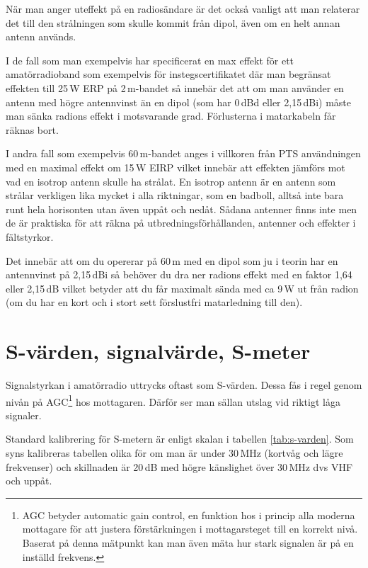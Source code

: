När man anger uteffekt på en radiosändare är det också vanligt att man
relaterar det till den strålningen som skulle kommit från dipol, även om en
helt annan antenn används.

I de fall som man exempelvis har specificerat en max effekt för ett
amatörradioband som exempelvis för instegscertifikatet där man begränsat
effekten till 25\,W ERP på 2\,m-bandet så innebär det att om man använder en
antenn med högre antennvinst än en dipol (som har 0\,dBd eller 2,15\,dBi)
måste man sänka radions effekt i motsvarande grad. Förlusterna i matarkabeln
får räknas bort.

I andra fall som exempelvis 60\,m-bandet anges i villkoren från PTS
användningen med en maximal effekt om 15\,W EIRP vilket innebär att effekten
jämförs mot vad en isotrop antenn skulle ha strålat. En isotrop antenn är en
antenn som strålar verkligen lika mycket i alla riktningar, som en badboll,
alltså inte bara runt hela horisonten utan även uppåt och nedåt. Sådana
antenner finns inte men de är praktiska för att räkna på
utbredningsförhållanden, antenner och effekter i fältstyrkor.

Det innebär att om du opererar på 60\,m med en dipol som ju i teorin har en
antennvinst på 2,15\,dBi så behöver du dra ner radions effekt med en faktor
1,64 eller 2,15\,dB vilket betyder att du får maximalt sända med ca 9\,W ut
från radion (om du har en kort och i stort sett förslustfri matarledning till
den).

\clearpage

\section{S-värden, signalvärde, S-meter}

Signalstyrkan i amatörradio uttrycks oftast som S-värden. Dessa fås i regel
genom nivån på AGC\footnote{AGC betyder automatic gain control, en funktion
hos i princip alla moderna mottagare för att justera förstärkningen i
mottagarsteget till en korrekt nivå. Baserat på denna mätpunkt kan man även
mäta hur stark signalen är på en inställd frekvens.} hos mottagaren. Därför
ser man sällan utslag vid riktigt låga signaler.

Standard kalibrering för S-metern är enligt skalan i tabellen
\ref{tab:s-varden}. Som syns kalibreras tabellen olika för om man är under
30\,MHz (kortvåg och lägre frekvenser) och skillnaden är 20\,dB med högre
känslighet över 30\,MHz dvs VHF och uppåt.

